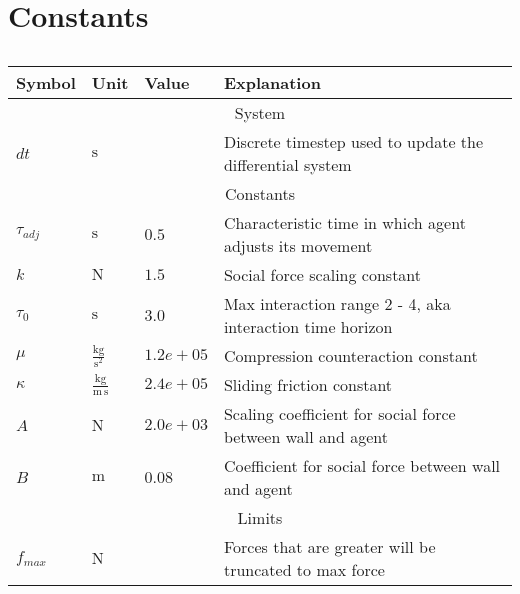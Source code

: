 \section{Constants}

\begin{table}[H]
\begin{tabular}{ |llll| }
\hline
Symbol         & Unit & Value & Explanation \\
\hline
\multicolumn{4}{c}{System} \\
\hline
$ dt $ & $ \mathrm{s} $ &  & Discrete timestep used to update the differential system \\
\hline
\multicolumn{4}{c}{Constants} \\
\hline
$ \tau_{adj} $ & $ \mathrm{s} $ & $ 0.5 $ & Characteristic time in which agent adjusts its movement \\
$ k $          & $ \mathrm{N} $ & $ 1.5 $ & Social force scaling constant \\
$ \tau_{0} $   & $ \mathrm{s} $ & $ 3.0 $ & Max interaction range 2 - 4, aka interaction time horizon \\
$ \mu $        & $ \mathrm{\frac{kg}{s^{2}}} $ & $ 1.2e+05 $ & Compression counteraction constant \\
$ \kappa $     & $ \mathrm{\frac{kg}{m\,s}} $ & $ 2.4e+05 $ & Sliding friction constant \\
$ A $          & $ \mathrm{N} $ & $ 2.0e+03 $ & Scaling coefficient for social force between wall and agent \\
$ B $          & $ \mathrm{m} $ & $ 0.08 $ & Coefficient for social force between wall and agent \\
\hline
\multicolumn{4}{c}{Limits} \\
\hline
$ f_{max} $    & $ \mathrm{N} $ &  & Forces that are greater will be truncated to max force \\
\hline
\end{tabular} 
\caption{}
\end{table}
